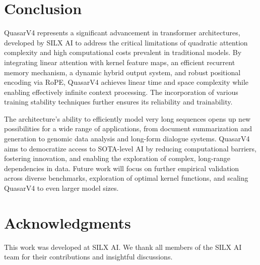 \documentclass{article}
\begin{document}
\section{Conclusion}
QuasarV4 represents a significant advancement in transformer architectures, developed by SILX AI to address the critical limitations of quadratic attention complexity and high computational costs prevalent in traditional models. By integrating linear attention with kernel feature maps, an efficient recurrent memory mechanism, a dynamic hybrid output system, and robust positional encoding via RoPE, QuasarV4 achieves linear time and space complexity while enabling effectively infinite context processing. The incorporation of various training stability techniques further ensures its reliability and trainability.

The architecture's ability to efficiently model very long sequences opens up new possibilities for a wide range of applications, from document summarization and generation to genomic data analysis and long-form dialogue systems. QuasarV4 aims to democratize access to SOTA-level AI by reducing computational barriers, fostering innovation, and enabling the exploration of complex, long-range dependencies in data. Future work will focus on further empirical validation across diverse benchmarks, exploration of optimal kernel functions, and scaling QuasarV4 to even larger model sizes.

\section*{Acknowledgments}
This work was developed at SILX AI. We thank all members of the SILX AI team for their contributions and insightful discussions.

  
  
\end{document}
